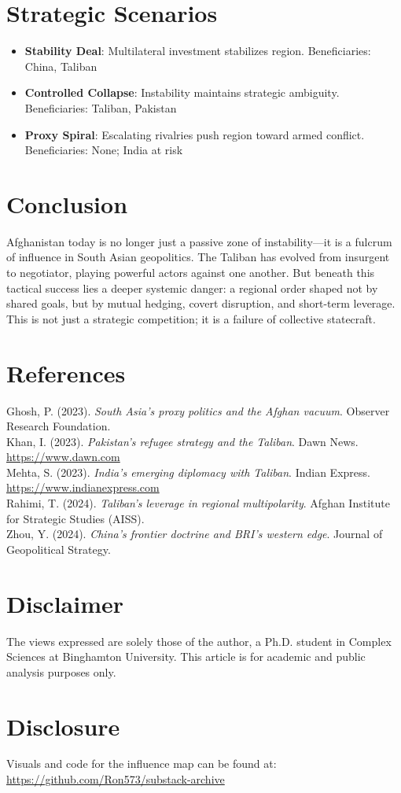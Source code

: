 \documentclass[11pt]{article}
\begin{document}
\section*{Strategic Scenarios}
\begin{itemize}
\item \textbf{Stability Deal}: Multilateral investment stabilizes region. Beneficiaries: China, Taliban
\item \textbf{Controlled Collapse}: Instability maintains strategic ambiguity. Beneficiaries: Taliban, Pakistan
\item \textbf{Proxy Spiral}: Escalating rivalries push region toward armed conflict. Beneficiaries: None; India at risk
\end{itemize}

\section*{Conclusion}
Afghanistan today is no longer just a passive zone of instability—it is a fulcrum of influence in South Asian geopolitics. The Taliban has evolved from insurgent to negotiator, playing powerful actors against one another. But beneath this tactical success lies a deeper systemic danger: a regional order shaped not by shared goals, but by mutual hedging, covert disruption, and short-term leverage. This is not just a strategic competition; it is a failure of collective statecraft.

\section*{References}
Ghosh, P. (2023). \textit{South Asia’s proxy politics and the Afghan vacuum}. Observer Research Foundation.\\
Khan, I. (2023). \textit{Pakistan’s refugee strategy and the Taliban}. Dawn News. \url{https://www.dawn.com}\\
Mehta, S. (2023). \textit{India’s emerging diplomacy with Taliban}. Indian Express. \url{https://www.indianexpress.com}\\
Rahimi, T. (2024). \textit{Taliban's leverage in regional multipolarity}. Afghan Institute for Strategic Studies (AISS).\\
Zhou, Y. (2024). \textit{China’s frontier doctrine and BRI’s western edge}. Journal of Geopolitical Strategy.

\section*{Disclaimer}
The views expressed are solely those of the author, a Ph.D. student in Complex Sciences at Binghamton University. This article is for academic and public analysis purposes only.

\section*{Disclosure}
Visuals and code for the influence map can be found at: \url{https://github.com/Ron573/substack-archive}
\end{document}
